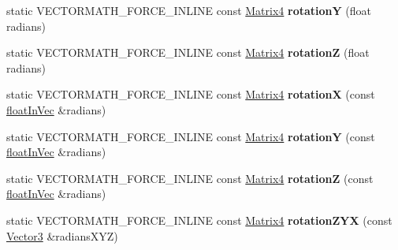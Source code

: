 \begin{DoxyCompactItemize}
\item 
\mbox{\label{classVectormath_1_1Aos_1_1Matrix4_ac7323763ea9343c396c5e94bbd4a0495}} 
static V\+E\+C\+T\+O\+R\+M\+A\+T\+H\+\_\+\+F\+O\+R\+C\+E\+\_\+\+I\+N\+L\+I\+NE const \hyperlink{classVectormath_1_1Aos_1_1Matrix4}{Matrix4} {\bfseries rotationY} (float radians)
\item 
\mbox{\label{classVectormath_1_1Aos_1_1Matrix4_a94b36fc1b5b38772e8b22822a0e7a71f}} 
static V\+E\+C\+T\+O\+R\+M\+A\+T\+H\+\_\+\+F\+O\+R\+C\+E\+\_\+\+I\+N\+L\+I\+NE const \hyperlink{classVectormath_1_1Aos_1_1Matrix4}{Matrix4} {\bfseries rotationZ} (float radians)
\item 
\mbox{\label{classVectormath_1_1Aos_1_1Matrix4_a319a56830e52f3672d5660696f317fa1}} 
static V\+E\+C\+T\+O\+R\+M\+A\+T\+H\+\_\+\+F\+O\+R\+C\+E\+\_\+\+I\+N\+L\+I\+NE const \hyperlink{classVectormath_1_1Aos_1_1Matrix4}{Matrix4} {\bfseries rotationX} (const \hyperlink{classVectormath_1_1floatInVec}{float\+In\+Vec} \&radians)
\item 
\mbox{\label{classVectormath_1_1Aos_1_1Matrix4_a1fb7c756de921a0dd673265ec772d3cf}} 
static V\+E\+C\+T\+O\+R\+M\+A\+T\+H\+\_\+\+F\+O\+R\+C\+E\+\_\+\+I\+N\+L\+I\+NE const \hyperlink{classVectormath_1_1Aos_1_1Matrix4}{Matrix4} {\bfseries rotationY} (const \hyperlink{classVectormath_1_1floatInVec}{float\+In\+Vec} \&radians)
\item 
\mbox{\label{classVectormath_1_1Aos_1_1Matrix4_ad6f68ee636dfdfac03fd0be824ec3052}} 
static V\+E\+C\+T\+O\+R\+M\+A\+T\+H\+\_\+\+F\+O\+R\+C\+E\+\_\+\+I\+N\+L\+I\+NE const \hyperlink{classVectormath_1_1Aos_1_1Matrix4}{Matrix4} {\bfseries rotationZ} (const \hyperlink{classVectormath_1_1floatInVec}{float\+In\+Vec} \&radians)
\item 
\mbox{\label{classVectormath_1_1Aos_1_1Matrix4_a7fa9c305f8fdb0bd26bf536cbdd5040f}} 
static V\+E\+C\+T\+O\+R\+M\+A\+T\+H\+\_\+\+F\+O\+R\+C\+E\+\_\+\+I\+N\+L\+I\+NE const \hyperlink{classVectormath_1_1Aos_1_1Matrix4}{Matrix4} {\bfseries rotation\+Z\+YX} (const \hyperlink{classVectormath_1_1Aos_1_1Vector3}{Vector3} \&radians\+X\+YZ)
\item 

\end{DoxyCompactItemize}
